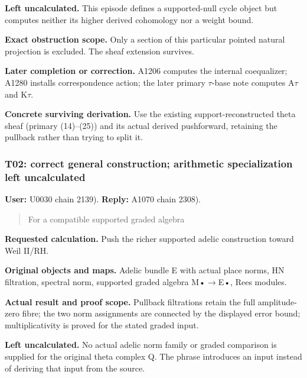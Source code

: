\textbf{Left uncalculated.} This episode defines a supported-null cycle
object but computes neither its higher derived cohomology nor a weight
bound.

\textbf{Exact obstruction scope.} Only a section of this particular
pointed natural projection is excluded. The sheaf extension survives.

\textbf{Later completion or correction.} A1206 computes the internal
coequalizer; A1280 installs correspondence action; the later primary
\allowbreak{}\ensuremath{τ}\allowbreak{}-base note computes
A\allowbreak{}\ensuremath{τ}\allowbreak{} and
K\allowbreak{}\ensuremath{τ}\allowbreak{}.

\textbf{Concrete surviving derivation.} Use the existing
support-reconstructed theta sheaf (primary (14)--(25)) and its actual
derived pushforward, retaining the pullback rather than trying to split
it.

\subsubsection{T02: correct general construction; arithmetic
specialization left
uncalculated}\label{TranscriptLedgerStage:t02-correct-general-construction-arithmetic-specialization-left-uncalculated}

\textbf{User:} U0030
\protect{} chain 2139).
\textbf{Reply:} A1070
\protect{} chain 2308).

\begin{quote}
For a compatible supported graded algebra
\end{quote}

\textbf{Requested calculation.} Push the richer supported adelic
construction toward Weil II/RH.

\textbf{Original objects and maps.} Adelic bundle E with actual place
norms, HN filtration, spectral norm, supported graded algebra
M•\allowbreak{}\ensuremath{→}\allowbreak{}E•, Rees modules.

\textbf{Actual result and proof scope.} Pullback filtrations retain the
full amplitude-zero fibre; the two norm assignments are connected by the
displayed error bound; multiplicativity is proved for the stated graded
input.

\textbf{Left uncalculated.} No actual adelic norm family or graded
comparison is supplied for the original theta complex Q. The phrase
introduces an input instead of deriving that input from the source.

